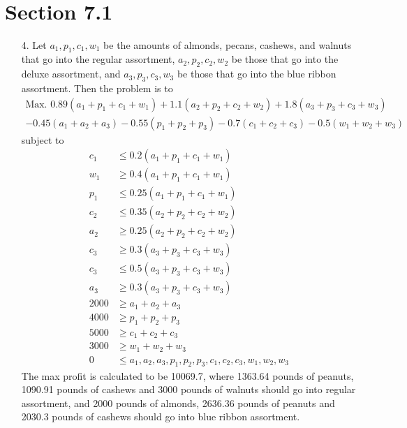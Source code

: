 \documentclass[10pt]{report}
\title{
	\courseTitle\\
	\hwNo\\
	\hwDate
}
\author{\hwAuther}
\date{}
\begin{document}
\maketitle

\section*{Section 7.1}
\begin{enumerate}
	\item [4.]
	Let $a_1, p_1, c_1, w_1$ be the amounts of almonds, pecans, cashews, and walnuts that go into the regular assortment, $a_2, p_2, c_2, w_2$ be those that go into the deluxe assortment, and $a_3, p_3, c_3, w_3$ be those that go into the blue ribbon assortment. Then the problem is to 
	\begin{multline*}
		\text{Max. } 0.89 (a_1 + p_1 + c_1 + w_1) + 1.1 (a_2 + p_2 + c_2 + w_2) + 
		1.8 (a_3 + p_3 + c_3 + w_3) \\ - 0.45 (a_1 + a_2 + a_3) - 0.55 (p_1 + p_2 + p_3) - 0.7 (c_1 + c_2 + c_3) - 0.5 (w_1 + w_2 + w_3)
	\end{multline*}
	subject to
	\begin{align*}
		c_1 &\le 0.2 (a_1 + p_1 + c_1 + w_1) \\
		w_1 &\ge 0.4 (a_1 + p_1 + c_1 + w_1) \\
		p_1 &\le 0.25 (a_1 + p_1 + c_1 + w_1) \\
		c_2 &\le 0.35 (a_2 + p_2 + c_2 + w_2) \\
		a_2 &\ge 0.25 (a_2 + p_2 + c_2 + w_2) \\
		c_3 &\ge 0.3 (a_3 + p_3 + c_3 + w_3) \\
		c_3 &\le 0.5 (a_3 + p_3 + c_3 + w_3) \\
		a_3 &\ge 0.3 (a_3 + p_3 + c_3 + w_3) \\
		2000 &\ge a_1 + a_2 + a_3 \\
		4000 &\ge p_1 + p_2 + p_3 \\
		5000 &\ge c_1 + c_2 + c_3 \\
		3000 &\ge w_1 + w_2 + w_3 \\
		0 &\le a_1, a_2, a_3, p_1, p_2, p_3, c_1, c_2, c_3, w_1, w_2, w_3
	\end{align*}
	The max profit is calculated to be 10069.7, where 1363.64 pounds of peanuts, 1090.91 pounds of cashews and 3000 pounds of walnuts should go into regular assortment, and 2000 pounds of almonds, 2636.36 pounds of peanuts and 2030.3 pounds of cashews should go into blue ribbon assortment.
\end{enumerate}
\end{document}
